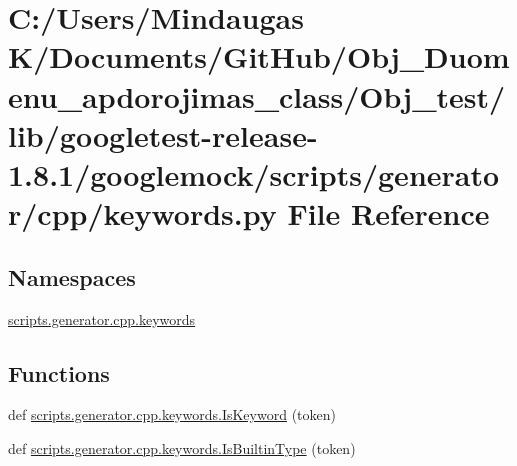 \hypertarget{_obj__test_2lib_2googletest-release-1_88_81_2googlemock_2scripts_2generator_2cpp_2keywords_8py}{}\section{C\+:/\+Users/\+Mindaugas K/\+Documents/\+Git\+Hub/\+Obj\+\_\+\+Duomenu\+\_\+apdorojimas\+\_\+class/\+Obj\+\_\+test/lib/googletest-\/release-\/1.8.1/googlemock/scripts/generator/cpp/keywords.py File Reference}
\label{_obj__test_2lib_2googletest-release-1_88_81_2googlemock_2scripts_2generator_2cpp_2keywords_8py}
\subsection*{Namespaces}
\begin{DoxyCompactItemize}
\item 
 \mbox{\hyperlink{namespacescripts_1_1generator_1_1cpp_1_1keywords}{scripts.\+generator.\+cpp.\+keywords}}
\end{DoxyCompactItemize}
\subsection*{Functions}
\begin{DoxyCompactItemize}
\item 
def \mbox{\hyperlink{namespacescripts_1_1generator_1_1cpp_1_1keywords_a7f43ad31fd6c84215cb8f90e66fb22f8}{scripts.\+generator.\+cpp.\+keywords.\+Is\+Keyword}} (token)
\item 
def \mbox{\hyperlink{namespacescripts_1_1generator_1_1cpp_1_1keywords_a59b8831daced8b5b7d9d3b708c940421}{scripts.\+generator.\+cpp.\+keywords.\+Is\+Builtin\+Type}} (token)
\end{DoxyCompactItemize}

